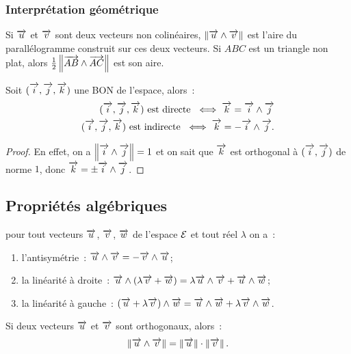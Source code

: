 \subsubsection{Interprétation géométrique}

Si \(\vu\) et \(\vv\) sont deux vecteurs non colinéaires, 
\(\norme{\vu\wedge\vv}\) est l'aire du parallélogramme construit sur ces deux 
vecteurs. Si \(ABC\) est un triangle non plat, alors 
\(\frac{1}{2}\norme{\vect{AB}\wedge\vect{AC}}\) est son aire.
\begin{prop}
  Soit \(\bondtrois\) une BON de l'espace, alors~:
  \begin{align}
    \bondtrois\text{~est directe~}\iff \vk = \vi\wedge\vj\\
    \bondtrois\text{~est indirecte~}\iff \vk = -\vi\wedge\vj.
  \end{align}
\end{prop}

\begin{proof}
  En effet, on a \(\norme{\vi\wedge\vj}=1\) et on sait que \(\vk\) est 
  orthogonal à \((\vi, \vj)\) de norme \(1\), donc \(\vk = \pm\vi\wedge\vj\).
\end{proof}

\subsection{Propriétés algébriques}

\begin{prop}
  pour tout vecteurs \(\vu\), \(\vv\), \(\vw\) de l'espace \(\E\) et tout réel 
  \(\lambda\) on a~:
  \begin{enumerate}
    \item l'antisymétrie~: \(\vu\wedge\vv = -\vv\wedge\vu\);
    \item la linéarité à droite~: \(\vu\wedge(\lambda\vv + \vw) = 
      \lambda\vu\wedge\vv + \vu\wedge\vw\);
    \item la linéarité à gauche~: \((\vu + \lambda\vv)\wedge\vw = \vu\wedge\vw 
      + \lambda\vv\wedge\vw\).
  \end{enumerate}
\end{prop}

\begin{prop}
  Si deux vecteurs \(\vu\) et \(\vv\) sont orthogonaux, alors~:
  \begin{equation}
    \norme{\vu\wedge\vv} = \norme{\vu}\cdot\norme{\vv}.
  \end{equation}
\end{prop}

